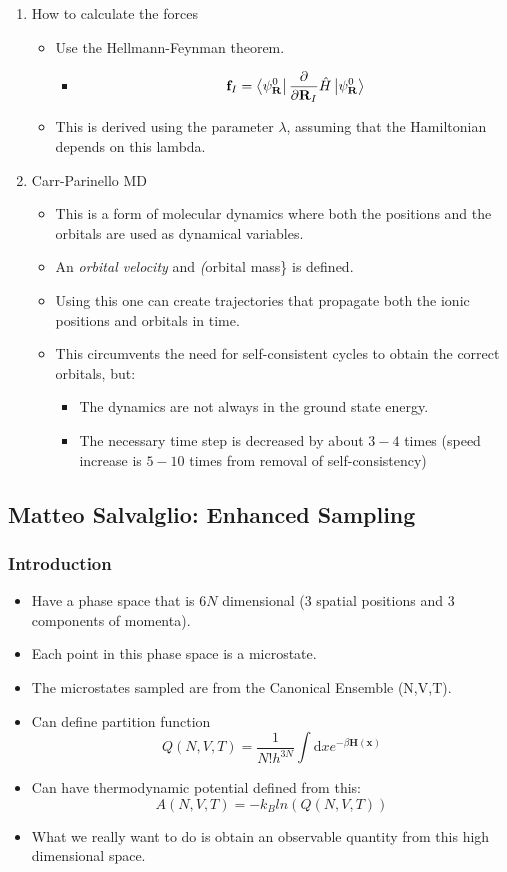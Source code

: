 \documentclass[11pt]{article}
\begin{document}
\begin{enumerate}
\begin{enumerate}
\item How to calculate the forces
\label{sec:org2eae198}
\begin{itemize}
\item Use the Hellmann-Feynman theorem.
\begin{itemize}
\item $$ \mathbf{f}_{I} = \bra{ \psi^{0}_{\mathbf{R}} }
         \frac{\partial}{\partial   \mathbf{R}_{I}}\hat{H} \ket{ \psi^{0}_{\mathbf{R}} }  $$
\end{itemize}
\item This is derived using the parameter \(\lambda\), assuming that the
Hamiltonian depends on this lambda.
\end{itemize}

\item Carr-Parinello MD
\label{sec:org8eb0b51}
\begin{itemize}
\item This is a form of molecular dynamics where both the positions and the
orbitals are used as dynamical variables.
\item An \emph{orbital velocity} and \emph(orbital mass\} is defined.
\item Using this one can create trajectories that propagate both the ionic
positions and orbitals in time.
\item This circumvents the need for self-consistent cycles to obtain the
correct orbitals, but:
\begin{itemize}
\item The dynamics are not always in the ground state
energy.
\item The necessary time step is decreased by about \(3-4\) times (speed
increase is \(5-10\) times from removal of self-consistency)
\end{itemize}
\end{itemize}
\end{enumerate}

\subsection{Matteo Salvalglio: Enhanced Sampling}
\label{sec:org0eb8541}
\subsubsection{Introduction}
\label{sec:org665cf0d}
\begin{itemize}
\item Have a phase space that is \(6N\) dimensional (3 spatial positions and 3
components of momenta).
\item Each point in this phase space is a microstate.
\item The microstates sampled are from the Canonical Ensemble (N,V,T).
\item Can define partition function \[ Q(N,V,T) = \frac{1}{N!h^{3N}}\int
     \text{d}x e^{-\beta\mathbf{H(x)}} \]
\item Can have thermodynamic potential defined from this: \[ A(N,V,T) =
     -k_{B}ln(Q(N,V,T)) \]
\item What we really want to do is obtain an observable quantity from this high
dimensional space.
\end{itemize}

\end{enumerate}
\end{document}
